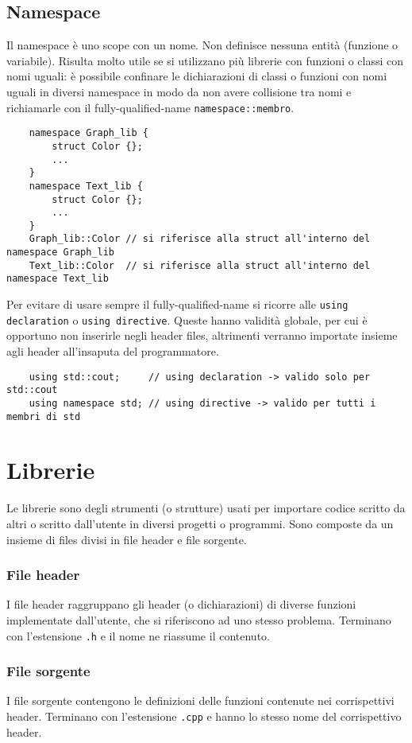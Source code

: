 \documentclass[a4paper]{article}
\begin{document}
\subsection{Namespace}
Il namespace è uno scope con un nome. Non definisce nessuna entità (funzione o variabile). Risulta molto utile se si utilizzano
più librerie con funzioni o classi con nomi uguali: è possibile confinare le dichiarazioni di classi o funzioni con nomi uguali
in diversi namespace in modo da non avere collisione tra nomi e richiamarle con il fully-qualified-name \verb|namespace::membro|.
\begin{lstlisting}
	namespace Graph_lib {
		struct Color {};
		...
	}
	namespace Text_lib {
		struct Color {};
		...
	}
	Graph_lib::Color // si riferisce alla struct all'interno del namespace Graph_lib
	Text_lib::Color  // si riferisce alla struct all'interno del namespace Text_lib
\end{lstlisting}
Per evitare di usare sempre il fully-qualified-name si ricorre alle \verb|using declaration| o \verb|using directive|. Queste
hanno validità globale, per cui è opportuno non inserirle negli header files, altrimenti verranno importate insieme agli header
all'insaputa del programmatore.
\begin{lstlisting}
	using std::cout;     // using declaration -> valido solo per std::cout
	using namespace std; // using directive -> valido per tutti i membri di std
\end{lstlisting}

\section{Librerie}
Le librerie sono degli strumenti (o strutture) usati per importare codice scritto da altri o scritto dall'utente in diversi
progetti o programmi. Sono composte da un insieme di files divisi in file header e file sorgente.

\subsubsection*{File header}
I file header raggruppano gli header (o dichiarazioni) di diverse funzioni implementate dall'utente, che si riferiscono ad uno
stesso problema. Terminano con l'estensione \verb|.h| e il nome ne riassume il contenuto.

\subsubsection*{File sorgente}
I file sorgente contengono le definizioni delle funzioni contenute nei corrispettivi header. Terminano con l'estensione \verb|.cpp|
e hanno lo stesso nome del corrispettivo header.
\end{document}
